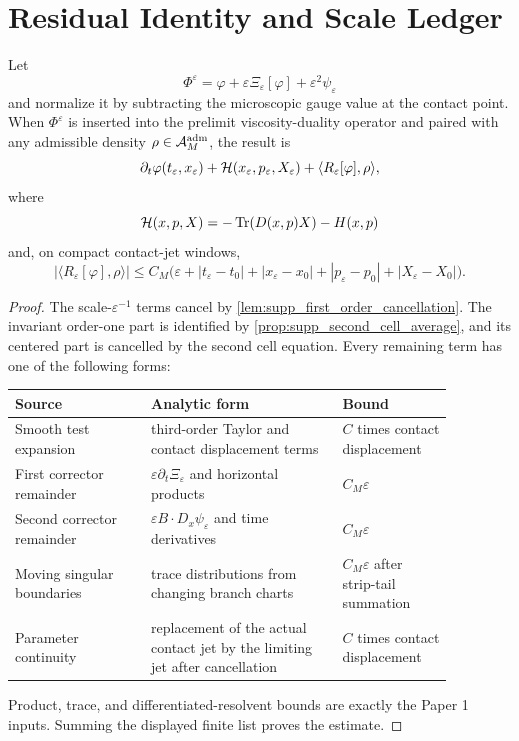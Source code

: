 \section{Residual Identity and Scale Ledger}

\begin{lemma}
\label{lem:supp_residual_identity}
Let
\[
  \Phi^\varepsilon
  =
  \varphi
  +\varepsilon\Xi_\varepsilon[\varphi]
  +\varepsilon^2\psi_\varepsilon
\]
and normalize it by subtracting the microscopic gauge value at the contact
point.  When \(\Phi^\varepsilon\) is inserted into the prelimit
viscosity-duality operator and paired with any admissible density
\(\rho\in\mathcal A^{\mathrm{adm}}_M\), the result is
\[
  \partial_t\varphi(t_\varepsilon,x_\varepsilon)
  +\mathcal H(x_\varepsilon,p_\varepsilon,X_\varepsilon)
  +\langle R_\varepsilon[\varphi],\rho\rangle ,
\]
where
\[
  \mathcal H(x,p,X)=-\operatorname{Tr}(D(x,p)X)-H(x,p)
\]
and, on compact contact-jet windows,
\[
  |\langle R_\varepsilon[\varphi],\rho\rangle|
  \le
  C_M\bigl(
  \varepsilon
  +|t_\varepsilon-t_0|
  +|x_\varepsilon-x_0|
  +|p_\varepsilon-p_0|
  +|X_\varepsilon-X_0|
  \bigr).
\]
\end{lemma}

\begin{proof}
The scale-\(\varepsilon^{-1}\) terms cancel by
\cref{lem:supp_first_order_cancellation}.  The invariant order-one part is
identified by \cref{prop:supp_second_cell_average}, and its centered part is
cancelled by the second cell equation.  Every remaining term has one of the
following forms:
\begin{center}
\small
\begin{tabular}{p{0.27\linewidth}p{0.38\linewidth}p{0.22\linewidth}}
\hline
Source & Analytic form & Bound \\
\hline
Smooth test expansion &
third-order Taylor and contact displacement terms &
\(C\) times contact displacement \\
First corrector remainder &
\(\varepsilon\partial_t\Xi_\varepsilon\) and horizontal products &
\(C_M\varepsilon\) \\
Second corrector remainder &
\(\varepsilon B\cdot D_x\psi_\varepsilon\) and time derivatives &
\(C_M\varepsilon\) \\
Moving singular boundaries &
trace distributions from changing branch charts &
\(C_M\varepsilon\) after strip-tail summation \\
Parameter continuity &
replacement of the actual contact jet by the limiting jet after cancellation &
\(C\) times contact displacement \\
\hline
\end{tabular}
\end{center}
Product, trace, and differentiated-resolvent bounds are exactly the Paper 1
inputs.  Summing the displayed finite list proves the estimate.
\end{proof}

